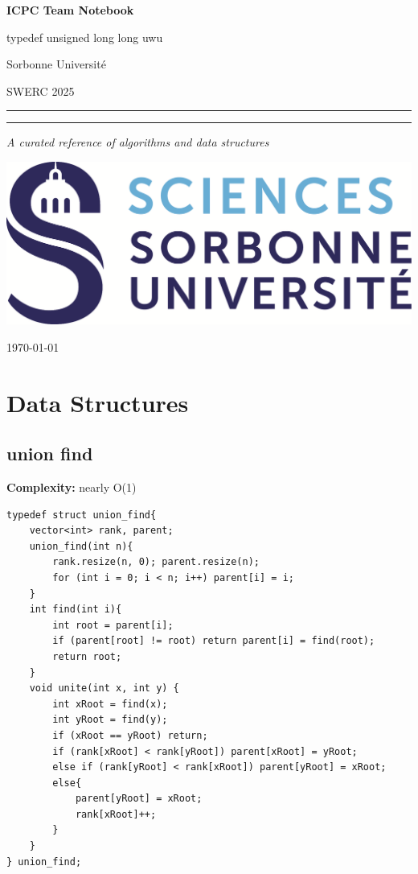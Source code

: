 \documentclass[10pt,a4paper]{article}
\begin{document}
\begin{titlepage}
  \centering

  \vspace*{2cm}
  {\Huge\bfseries ICPC Team Notebook\par}
  \vspace{1cm}

  {\Large {typedef unsigned long long uwu}\par}
  {\Large {Sorbonne Université}\par}
  {\Large SWERC 2025\par}
  \vspace{1.5cm}

  \rule{\linewidth}{1.5pt}\par
  \vspace{0.5cm}
  \rule{\linewidth}{0.5pt}\par
  \vspace{1.5cm}

  {\LARGE \itshape A curated reference of algorithms and data structures\par}
  \vspace{1cm}

  \includegraphics[width=0.2 \textwidth]{img/logo.png}\par
  \vspace{1cm}

  {\large \today\par}

  \clearpage
\end{titlepage}


\clearpage
\tableofcontents

\twocolumn

\section{Data Structures}

\subsection{union find}

\textbf{Complexity:} nearly O(1)
\begin{verbatim}
typedef struct union_find{
    vector<int> rank, parent;
    union_find(int n){
        rank.resize(n, 0); parent.resize(n);
        for (int i = 0; i < n; i++) parent[i] = i;
    }
    int find(int i){
        int root = parent[i];
        if (parent[root] != root) return parent[i] = find(root);
        return root;
    }
    void unite(int x, int y) {
        int xRoot = find(x);
        int yRoot = find(y);
        if (xRoot == yRoot) return;
        if (rank[xRoot] < rank[yRoot]) parent[xRoot] = yRoot;
        else if (rank[yRoot] < rank[xRoot]) parent[yRoot] = xRoot;
        else{
            parent[yRoot] = xRoot;
            rank[xRoot]++;
        }
    }
} union_find;
\end{verbatim}
\end{document}
